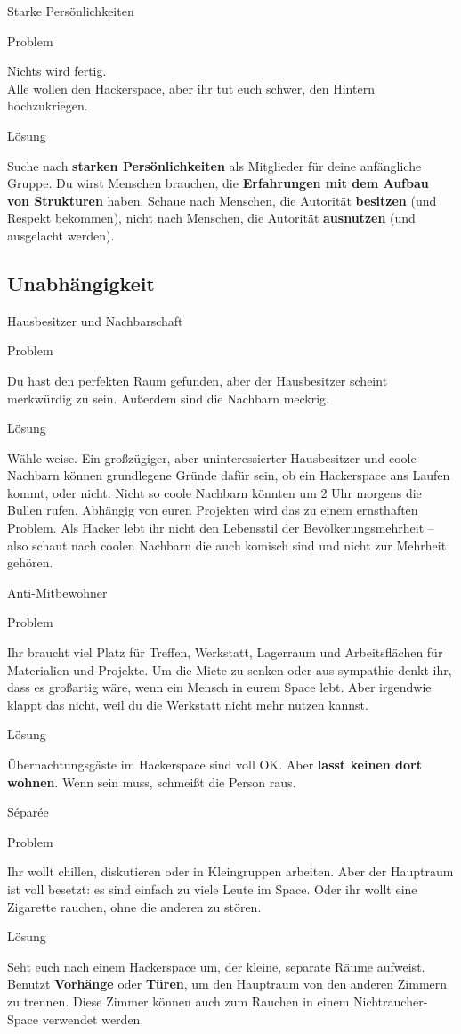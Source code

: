 \documentclass[aspectratio=1610]{beamer}
\newcommand{\pattern}[2]{
  \begin{alertblock}{Problem}
    #1
  \end{alertblock}
  \pause
  \begin{exampleblock}{Lösung}
    #2
  \end{exampleblock}
}
\begin{document}
  \begin{frame}{Starke Persönlichkeiten}
    \pattern{
      Nichts wird fertig.\\
      Alle wollen den Hackerspace, aber ihr tut euch schwer, den Hintern hochzukriegen.
    }{
      Suche nach \textbf{starken Persönlichkeiten} als Mitglieder für deine
      anfängliche Gruppe. Du wirst Menschen brauchen, die \textbf{Erfahrungen
      mit dem Aufbau von Strukturen} haben. Schaue nach Menschen, die
      Autorität \textbf{besitzen} (und Respekt bekommen), nicht nach Menschen,
      die Autorität \textbf{ausnutzen} (und ausgelacht werden).
    }
  \end{frame}

  \subsection{Unabhängigkeit}

  \begin{frame}{Hausbesitzer und Nachbarschaft}
    \pattern{
      Du hast den perfekten Raum gefunden, aber der Hausbesitzer scheint
      merkwürdig zu sein. Außerdem sind die Nachbarn meckrig.
    }{
      Wähle weise. Ein großzügiger, aber uninteressierter Hausbesitzer und coole
      Nachbarn können grundlegene Gründe dafür sein, ob ein Hackerspace ans
      Laufen kommt, oder nicht. Nicht so coole Nachbarn könnten um 2 Uhr morgens
      die Bullen rufen. Abhängig von euren Projekten wird das zu einem
      ernsthaften Problem. Als Hacker lebt ihr nicht den Lebensstil der
      Bevölkerungsmehrheit – also schaut nach coolen Nachbarn die auch komisch
      sind und nicht zur Mehrheit gehören.
    }
  \end{frame}

  \begin{frame}{Anti-Mitbewohner}
    \pattern{
      Ihr braucht viel Platz für Treffen, Werkstatt, Lagerraum und
      Arbeitsflächen für Materialien und Projekte. Um die Miete zu senken oder
      aus sympathie denkt ihr, dass es großartig wäre, wenn ein Mensch in eurem
      Space lebt. Aber irgendwie klappt das nicht, weil du die Werkstatt nicht
      mehr nutzen kannst.
    }{
      Übernachtungsgäste im Hackerspace sind voll OK. Aber \textbf{lasst keinen
      dort wohnen}. Wenn sein muss, schmeißt die Person raus.
    }
  \end{frame}

  \begin{frame}{Séparée}
    \pattern{
      Ihr wollt chillen, diskutieren oder in Kleingruppen arbeiten. Aber der
      Hauptraum ist voll besetzt: es sind einfach zu viele Leute im Space. Oder
      ihr wollt eine Zigarette rauchen, ohne die anderen zu stören.
    }{
      Seht euch nach einem Hackerspace um, der kleine, separate Räume aufweist.
      Benutzt \textbf{Vorhänge} oder \textbf{Türen}, um den Hauptraum von den
      anderen Zimmern zu trennen. Diese Zimmer können auch zum Rauchen in einem
      Nichtraucher-Space verwendet werden.
    }
  \end{frame}
\end{document}
